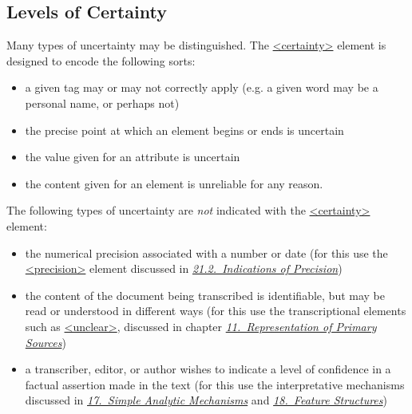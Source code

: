 \subsection[{Levels of Certainty}]{Levels of Certainty}\label{CECERT}\par
Many types of uncertainty may be distinguished. The \hyperref[TEI.certainty]{<certainty>} element is designed to encode the following sorts: \begin{itemize}
\item a given tag may or may not correctly apply (e.g. a given word may be a personal name, or perhaps not)
\item the precise point at which an element begins or ends is uncertain
\item the value given for an attribute is uncertain
\item the content given for an element is unreliable for any reason.
\end{itemize} \par
The following types of uncertainty are \textit{not} indicated with the \hyperref[TEI.certainty]{<certainty>} element: \begin{itemize}
\item the numerical precision associated with a number or date (for this use the \hyperref[TEI.precision]{<precision>} element discussed in \textit{\hyperref[CEPREC]{21.2.\ Indications of Precision}})
\item the content of the document being transcribed is identifiable, but may be read or understood in different ways (for this use the transcriptional elements such as \hyperref[TEI.unclear]{<unclear>}, discussed in chapter \textit{\hyperref[PH]{11.\ Representation of Primary Sources}})
\item a transcriber, editor, or author wishes to indicate a level of confidence in a factual assertion made in the text (for this use the interpretative mechanisms discussed in \textit{\hyperref[AI]{17.\ Simple Analytic Mechanisms}} and \textit{\hyperref[FS]{18.\ Feature Structures}})
\end{itemize} 
